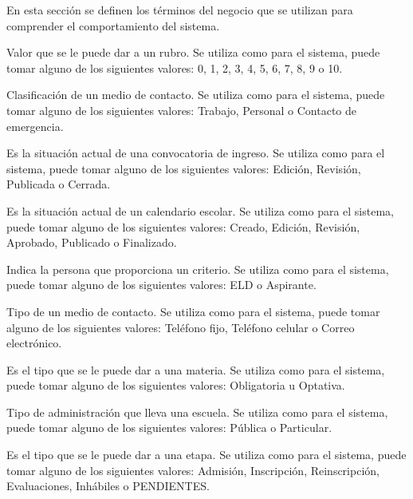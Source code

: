 En esta sección se definen los términos del negocio que se utilizan para comprender el comportamiento del sistema.

\begin{description}
	
	 Valor que se le puede dar a un rubro. Se utiliza como  para el sistema, puede tomar alguno de los siguientes valores: 0, 1, 2, 3, 4, 5, 6, 7, 8, 9 o 10.
	
	 Clasificación de un medio de contacto. Se utiliza como  para el sistema, puede tomar alguno de los siguientes valores: Trabajo, Personal o Contacto de emergencia.
	
	 Es la situación actual de una convocatoria de ingreso. Se utiliza como  para el sistema, puede tomar alguno de los siguientes valores: Edición, Revisión, Publicada o Cerrada.
	
	 Es la situación actual de un calendario escolar. Se utiliza como  para el sistema, puede tomar alguno de los siguientes valores: Creado, Edición, Revisión, Aprobado, Publicado o Finalizado.
	
	 Indica la persona que proporciona un criterio. Se utiliza como  para el sistema, puede tomar alguno de los siguientes valores: ELD o Aspirante.
	
	 Tipo de un medio de contacto. Se utiliza como  para el sistema, puede tomar alguno de los siguientes valores: Teléfono fijo, Teléfono celular o Correo electrónico.
	
	 Es el tipo que se le puede dar a una materia. Se utiliza como  para el sistema, puede tomar alguno de los siguientes valores: Obligatoria u Optativa.
	
	 Tipo de administración que lleva una escuela. Se utiliza como  para el sistema, puede tomar alguno de los siguientes valores: Pública o Particular.
	
	 Es el tipo que se le puede dar a una etapa. Se utiliza como  para el sistema, puede tomar alguno de los siguientes valores: Admisión, Inscripción, Reinscripción, Evaluaciones, Inhábiles o PENDIENTES.
	

\end{description}

